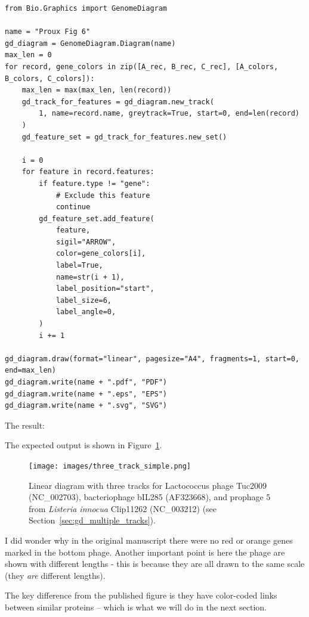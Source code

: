 \begin{verbatim}
from Bio.Graphics import GenomeDiagram

name = "Proux Fig 6"
gd_diagram = GenomeDiagram.Diagram(name)
max_len = 0
for record, gene_colors in zip([A_rec, B_rec, C_rec], [A_colors, B_colors, C_colors]):
    max_len = max(max_len, len(record))
    gd_track_for_features = gd_diagram.new_track(
        1, name=record.name, greytrack=True, start=0, end=len(record)
    )
    gd_feature_set = gd_track_for_features.new_set()

    i = 0
    for feature in record.features:
        if feature.type != "gene":
            # Exclude this feature
            continue
        gd_feature_set.add_feature(
            feature,
            sigil="ARROW",
            color=gene_colors[i],
            label=True,
            name=str(i + 1),
            label_position="start",
            label_size=6,
            label_angle=0,
        )
        i += 1

gd_diagram.draw(format="linear", pagesize="A4", fragments=1, start=0, end=max_len)
gd_diagram.write(name + ".pdf", "PDF")
gd_diagram.write(name + ".eps", "EPS")
gd_diagram.write(name + ".svg", "SVG")
\end{verbatim}

\begin{htmlonly}
\noindent The result:


\end{htmlonly}
\begin{latexonly}
\noindent The expected output is shown in Figure~\ref{fig:three_track_simple}.
\begin{figure}[htbp]
\centering
\texttt{[image: images/three\_track\_simple.png]}
\caption{Linear diagram with three tracks for Lactococcus phage Tuc2009
(NC\_002703), bacteriophage bIL285 (AF323668), and prophage 5 from
\textit{Listeria innocua} Clip11262 (NC\_003212)
(see Section~\ref{sec:gd_multiple_tracks}).}
\label{fig:three_track_simple}
\end{figure}
\end{latexonly}
I did wonder why in the original manuscript there were no red or orange genes
marked in the bottom phage. Another important point is here the phage are
shown with different lengths - this is because they are all drawn to the same
scale (they \emph{are} different lengths).

The key difference from the published figure is they have color-coded links
between similar proteins -- which is what we will do in the next section.

